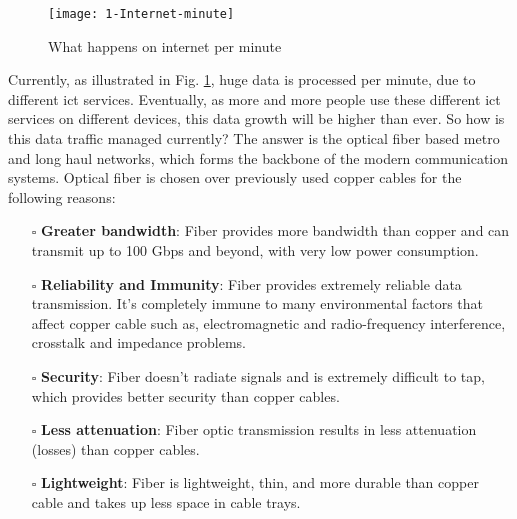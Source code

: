 \documentclass[../report.tex]{subfiles}
\begin{document}
\begin{figure}[!tbp]
	\centering
	\texttt{[image: 1-Internet-minute]}
	\caption{What happens on internet per minute \cite{internet_minute}}
	\label{fig:1_internet_minute}
\end{figure}
Currently, as illustrated in Fig. \ref{fig:1_internet_minute}, huge data is processed per minute, due to different \gls{ict} services. Eventually, as more and more people use these different \gls{ict} services on different devices, this data growth will be higher than ever. So how is this data traffic managed currently? The answer is the optical fiber based metro and long haul networks, which forms the backbone of the modern communication systems. Optical fiber is chosen over previously used copper cables for the following reasons:
\begin{itemize}
	\item[$\square$] \textbf{Greater bandwidth}: Fiber provides more bandwidth than copper and can transmit up to 100 Gbps and beyond, with very low power consumption.
	\item[$\square$] \textbf{Reliability and Immunity}: Fiber provides extremely reliable data transmission. It’s completely immune to many environmental factors that affect copper cable such as, electromagnetic and radio-frequency interference, crosstalk and impedance problems.  
	\item[$\square$] \textbf{Security}: Fiber doesn’t radiate signals and is extremely difficult to tap, which provides better security than copper cables.
	\item[$\square$] \textbf{Less attenuation}: Fiber optic transmission results in less attenuation (losses) than copper cables.
	\item[$\square$] \textbf{Lightweight}: Fiber is lightweight, thin, and more durable than copper cable and takes up less space in cable trays.
\end{itemize}
\end{document}
